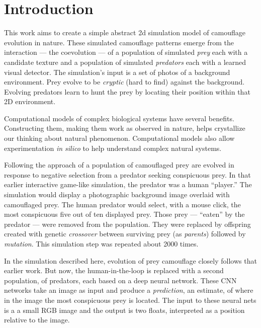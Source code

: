 \documentclass[acmtog]{acmart}
\newcommand{\jargon}[1]{\textit{#1}}
\begin{document}

\section{Introduction}
This work aims to create a simple abstract 2d simulation model of camouflage evolution in nature. These simulated camouflage patterns emerge from the interaction — the coevolution — of a population of simulated \jargon{prey} each with a candidate texture and a population of simulated \jargon{predators} each with a learned visual detector. The simulation's input is a set of photos of a background environment. Prey evolve to be \jargon{cryptic} (hard to find) against the background. Evolving predators learn to hunt the prey by locating their position within that 2D environment.
\par
Computational models of complex biological systems have several benefits. Constructing them, making them work as observed in nature, helps crystallize our thinking about natural phenomenon. Computational models also allow experimentation \textit{in silico} to help understand complex natural systems.
\par
Following the approach of \citet{reynolds_iec_2011} a population of camouflaged prey are evolved in response to negative selection from a predator seeking conspicuous prey. In that earlier interactive game-like simulation, the predator was a human “player.” The simulation would display a photographic background image overlaid with camouflaged prey. The human predator would select, with a mouse click, the most conspicuous five out of ten displayed prey. Those prey — “eaten” by the predator — were removed from the population.  They were replaced by offspring created with genetic \jargon{crossover} between surviving prey (as \jargon{parents}) followed by \jargon{mutation}. This simulation step was repeated about 2000 times.
\par
In the simulation described here, evolution of prey camouflage closely follows that earlier work. But now, the human-in-the-loop is replaced with a second population, of predators, each based on a deep neural network. These CNN networks take an image as input and produce a \jargon{prediction}, an estimate, of where in the image the most conspicuous prey is located. The input to these neural nets is a a small RGB image and the output is two floats, interpreted as a position relative to the image. 
\par
\end{document}
